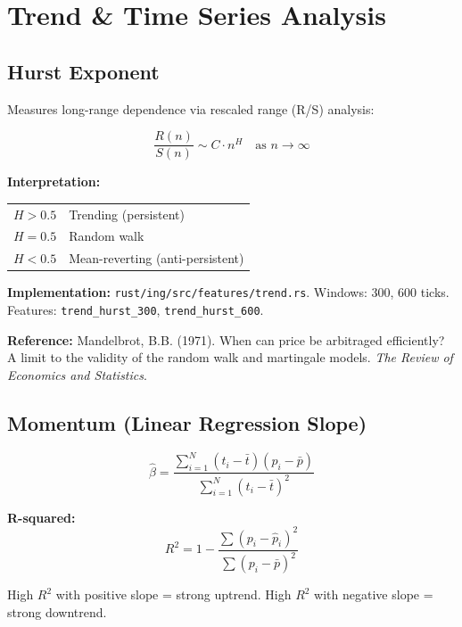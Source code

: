 \documentclass[11pt,a4paper]{article}
\begin{document}
\section{Trend \& Time Series Analysis}

\subsection{Hurst Exponent}

Measures long-range dependence via rescaled range (R/S) analysis:

\begin{equation}
\frac{R(n)}{S(n)} \sim C \cdot n^H \quad \text{as } n \to \infty
\end{equation}

\textbf{Interpretation:}
\begin{center}
\begin{tabular}{l l}
\hline
$H > 0.5$ & Trending (persistent) \\
$H = 0.5$ & Random walk \\
$H < 0.5$ & Mean-reverting (anti-persistent) \\
\hline
\end{tabular}
\end{center}

\textbf{Implementation:} \texttt{rust/ing/src/features/trend.rs}. Windows: 300, 600 ticks. Features: \texttt{trend\_hurst\_300}, \texttt{trend\_hurst\_600}.

\textbf{Reference:} Mandelbrot, B.B. (1971). When can price be arbitraged efficiently? A limit to the validity of the random walk and martingale models. \textit{The Review of Economics and Statistics}.

\subsection{Momentum (Linear Regression Slope)}

\begin{equation}
\hat{\beta} = \frac{\sum_{i=1}^{N} (t_i - \bar{t})(p_i - \bar{p})}{\sum_{i=1}^{N} (t_i - \bar{t})^2}
\end{equation}

\textbf{R-squared:}
\begin{equation}
R^2 = 1 - \frac{\sum (p_i - \hat{p}_i)^2}{\sum (p_i - \bar{p})^2}
\end{equation}

High $R^2$ with positive slope = strong uptrend. High $R^2$ with negative slope = strong downtrend.
\end{document}
